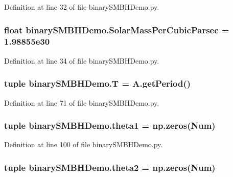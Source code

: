 Definition at line 32 of file binary\-S\-M\-B\-H\-Demo.\-py.

\hypertarget{namespacebinary_s_m_b_h_demo_ae0c87d5df255efd649e5a21e0bafbbc3}{
\subsubsection[{Solar\-Mass\-Per\-Cubic\-Parsec}]{\setlength{\rightskip}{0pt plus 5cm}float binary\-S\-M\-B\-H\-Demo.\-Solar\-Mass\-Per\-Cubic\-Parsec = 1.\-98855e30}}\label{namespacebinary_s_m_b_h_demo_ae0c87d5df255efd649e5a21e0bafbbc3}


Definition at line 34 of file binary\-S\-M\-B\-H\-Demo.\-py.

\hypertarget{namespacebinary_s_m_b_h_demo_a6e3697d31caf5b65c8bee29546abe4ff}{
\subsubsection[{T}]{\setlength{\rightskip}{0pt plus 5cm}tuple binary\-S\-M\-B\-H\-Demo.\-T = A.\-get\-Period()}}\label{namespacebinary_s_m_b_h_demo_a6e3697d31caf5b65c8bee29546abe4ff}


Definition at line 71 of file binary\-S\-M\-B\-H\-Demo.\-py.

\hypertarget{namespacebinary_s_m_b_h_demo_a39ae44217953e527dae779e7352ac627}{
\subsubsection[{theta1}]{\setlength{\rightskip}{0pt plus 5cm}tuple binary\-S\-M\-B\-H\-Demo.\-theta1 = np.\-zeros({\bf Num})}}\label{namespacebinary_s_m_b_h_demo_a39ae44217953e527dae779e7352ac627}


Definition at line 100 of file binary\-S\-M\-B\-H\-Demo.\-py.

\hypertarget{namespacebinary_s_m_b_h_demo_a45b253d55eb0b14ab6802f7b02bf5cf3}{
\subsubsection[{theta2}]{\setlength{\rightskip}{0pt plus 5cm}tuple binary\-S\-M\-B\-H\-Demo.\-theta2 = np.\-zeros({\bf Num})}}\label{namespacebinary_s_m_b_h_demo_a45b253d55eb0b14ab6802f7b02bf5cf3}


